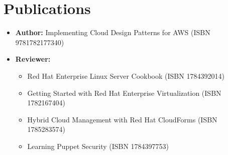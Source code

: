 \documentclass[a4paper,10pt]{article}
\begin{document}
\section*{Publications}
\begin{itemize}
    \item \textbf{Author:} Implementing Cloud Design Patterns for AWS (ISBN 9781782177340)
    \item \textbf{Reviewer:}
    \begin{itemize}
        \item Red Hat Enterprise Linux Server Cookbook (ISBN 1784392014)
        \item Getting Started with Red Hat Enterprise Virtualization (ISBN 1782167404)
        \item Hybrid Cloud Management with Red Hat CloudForms (ISBN 1785283574)
        \item Learning Puppet Security (ISBN 1784397753)
    \end{itemize}
\end{itemize}
\end{document}
